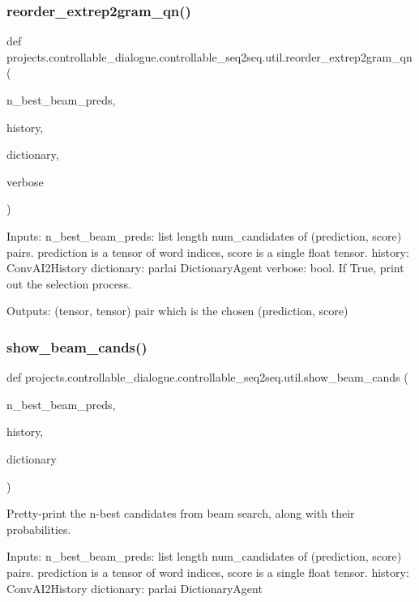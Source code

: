 \subsubsection{\texorpdfstring{reorder\+\_\+extrep2gram\+\_\+qn()}{reorder\_extrep2gram\_qn()}}
{\footnotesize\ttfamily def projects.\+controllable\+\_\+dialogue.\+controllable\+\_\+seq2seq.\+util.\+reorder\+\_\+extrep2gram\+\_\+qn (\begin{DoxyParamCaption}\item[{}]{n\+\_\+best\+\_\+beam\+\_\+preds,  }\item[{}]{history,  }\item[{}]{dictionary,  }\item[{}]{verbose }\end{DoxyParamCaption})}

\begin{DoxyVerb}Inputs:
    n_best_beam_preds: list length num_candidates of (prediction, score) pairs.
      prediction is a tensor of word indices, score is a single float tensor.
    history: ConvAI2History
    dictionary: parlai DictionaryAgent
    verbose: bool. If True, print out the selection process.

Outputs: (tensor, tensor) pair which is the chosen (prediction, score)
\end{DoxyVerb}
 \mbox{\label{namespaceprojects_1_1controllable__dialogue_1_1controllable__seq2seq_1_1util_ad8bee76107b49379c621746db6fd7d4e}} 
\subsubsection{\texorpdfstring{show\+\_\+beam\+\_\+cands()}{show\_beam\_cands()}}
{\footnotesize\ttfamily def projects.\+controllable\+\_\+dialogue.\+controllable\+\_\+seq2seq.\+util.\+show\+\_\+beam\+\_\+cands (\begin{DoxyParamCaption}\item[{}]{n\+\_\+best\+\_\+beam\+\_\+preds,  }\item[{}]{history,  }\item[{}]{dictionary }\end{DoxyParamCaption})}

\begin{DoxyVerb}Pretty-print the n-best candidates from beam search, along with their probabilities.

Inputs:
  n_best_beam_preds: list length num_candidates of (prediction, score) pairs.
    prediction is a tensor of word indices, score is a single float tensor.
  history: ConvAI2History
  dictionary: parlai DictionaryAgent
\end{DoxyVerb}
 